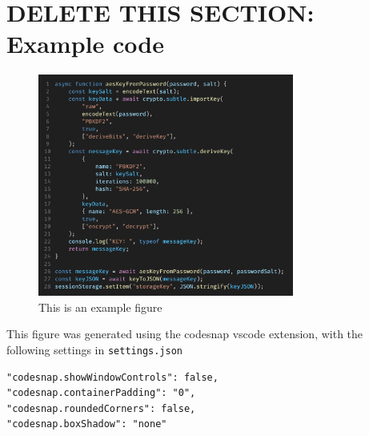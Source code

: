 \documentclass[12pt]{article}
\begin{document}
\newpage
\section{DELETE THIS SECTION: Example code}

\begin{figure}[h]
    \caption{This is an example figure}
    \centering
    \includegraphics[width=0.75\textwidth]{oldAesFromPassword.png}
\end{figure}

This figure was generated using the codesnap \cite{CodeSnap} vscode extension, with the following settings in \texttt{settings.json}

\begin{verbatim}
"codesnap.showWindowControls": false,
"codesnap.containerPadding": "0",
"codesnap.roundedCorners": false,
"codesnap.boxShadow": "none"
\end{verbatim}



\end{document}
